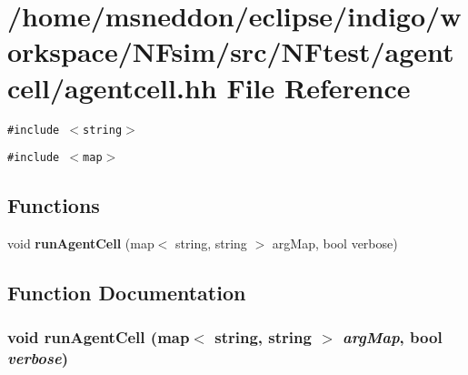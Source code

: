 \section{/home/msneddon/eclipse/indigo/workspace/NFsim/src/NFtest/agentcell/agentcell.hh File Reference}
\label{agentcell_8hh}


{\tt \#include $<$string$>$}\par
{\tt \#include $<$map$>$}\par
\subsection*{Functions}
\begin{CompactItemize}
\item 
void {\bf runAgentCell} (map$<$ string, string $>$ argMap, bool verbose)
\end{CompactItemize}


\subsection{Function Documentation}
\subsubsection{\setlength{\rightskip}{0pt plus 5cm}void runAgentCell (map$<$ string, string $>$ {\em argMap}, bool {\em verbose})}\label{agentcell_8hh_b3bca48acc52c98af56e755d0d017b31}


